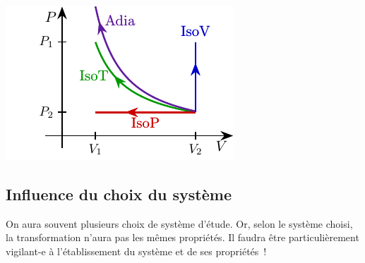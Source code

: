 \documentclass[../../main/main.tex]{subfiles}
\begin{document}
\begin{tcb*}[sidebyside, righthand ratio=.30]
\begin{center}
{			\includegraphics[width=\linewidth]{PV_all}
		}
		\vspace{-15pt}
	\end{center}
\end{tcb*}

\subsection{Influence du choix du système}
On aura souvent plusieurs choix de système d'étude. Or, selon le système choisi,
la transformation n'aura pas les mêmes propriétés. Il faudra être
particulièrement vigilant-e à l'établissement du système et de ses propriétés~!
\end{document}
